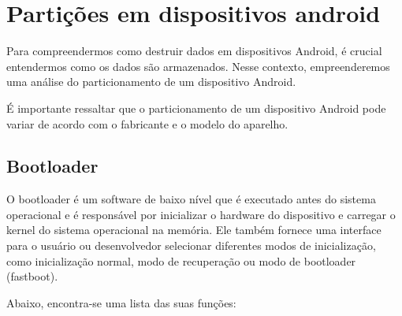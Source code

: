 \section{Partições em dispositivos android}
\label{particoes}

Para compreendermos como destruir dados em dispositivos Android, é crucial entendermos como os dados são armazenados. Nesse contexto, empreenderemos uma análise do particionamento de um dispositivo Android.

É importante ressaltar que o particionamento de um dispositivo Android pode variar de acordo com o fabricante e o modelo do aparelho.

\subsection{Bootloader}

O bootloader é um software de baixo nível que é executado antes do sistema operacional e é responsável por inicializar o hardware do dispositivo e carregar o kernel do sistema operacional na memória. Ele também fornece uma interface para o usuário ou desenvolvedor selecionar diferentes modos de inicialização, como inicialização normal, modo de recuperação ou modo de bootloader (fastboot).

Abaixo, encontra-se uma lista das suas funções:


